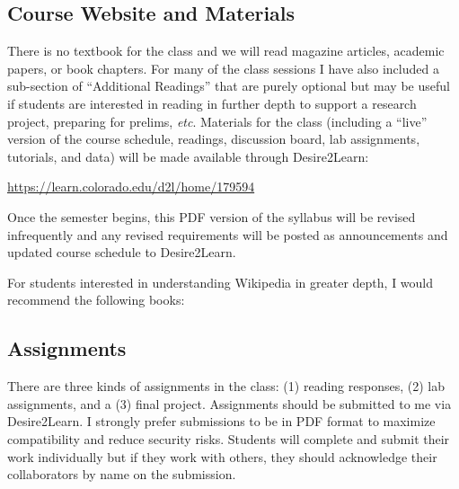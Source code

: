 \documentclass[10pt]{memoir}
\newenvironment{readinglist}{
\begin{list}{}{\leftmargin=8pt \itemindent=0em}
  \setlength{\itemsep}{8pt}
  \setlength{\parskip}{0em}
  \setlength{\parsep}{1em}
  \setlength{\parindent}{8em}}
{\end{list}}
\begin{document}
\subsection{Course Website and Materials}
There is no textbook for the class and we will read magazine articles, academic papers, or book chapters. For many of the class sessions I have also included a sub-section of ``Additional Readings'' that are purely optional but may be useful if students are interested in reading in further depth to support a research project, preparing for prelims, \textit{etc}. Materials for the class (including a ``live'' version of the course schedule, readings, discussion board, lab assignments, tutorials, and data) will be made available through \mbox{Desire2Learn}:
\vspace{-8pt}
    \begin{center}
    \href{https://https://learn.colorado.edu/d2l/home/179594}{https://learn.colorado.edu/d2l/home/179594}
    \end{center}
\vspace{-8pt}
Once the semester begins, this PDF version of the syllabus will be revised infrequently and any revised requirements will be posted as announcements and updated course schedule to \mbox{Desire2Learn}.

For students interested in understanding Wikipedia in greater depth, I would recommend the following books:

\begin{readinglist} 
    \item {}
    \item {}
    \item {}
    \item {}
    \item {}
\end{readinglist}

\subsection{Assignments}
There are three kinds of assignments in the class: (1) reading responses, (2) lab assignments, and a (3) final project. Assignments should be submitted to me via \mbox{Desire2Learn}. I strongly prefer submissions to be in PDF format to maximize compatibility and reduce security risks. Students will complete and submit their work individually but if they work with others, they should acknowledge their collaborators by name on the submission.
\end{document}
